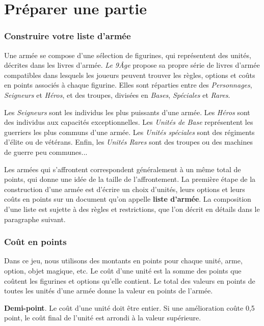 
\part{Préparer une partie}

\section{Construire votre liste d'armée}
\label{construire_liste}


Une armée se compose d'une sélection de figurines, qui représentent des unités, décrites dans les livres d'armée. \emph{Le 9\ieme Âge} propose sa propre série de livres d'armée compatibles dans lesquels les joueurs peuvent trouver les règles, options et coûts en points associés à chaque figurine. Elles sont réparties entre des \emph{Personnages}, \emph{Seigneurs} et \emph{Héros}, et des troupes, divisées en \emph{Bases}, \emph{Spéciales} et \emph{Rares}.

Les \emph{Seigneurs} sont les individus les plus puissants d'une armée. Les \emph{Héros} sont des individus aux capacités exceptionnelles. Les \emph{Unités de Base} représentent les guerriers les plus communs d'une armée. Les \emph{Unités spéciales} sont des régiments d'élite ou de vétérans. Enfin, les \emph{Unités Rares} sont des troupes ou des machines de guerre peu communes...

Les armées qui s'affrontent correspondent généralement à un même total de points, qui donne une idée de la taille de l'affrontement. La première étape de la construction d'une armée est d'écrire un choix d'unités, leurs options et leurs coûts en points sur un document qu'on appelle \textbf{liste d'armée}. La composition d'une liste est sujette à des règles et restrictions, que l'on décrit en détails dans le paragraphe suivant.

\section{Coût en points}

Dans ce jeu, nous utilisons des montants en points pour chaque unité, arme, option, objet magique, etc. Le coût d'une unité est la somme des points que coûtent les figurines et options qu'elle contient. Le total des valeurs en points de toutes les unités d'une armée donne la valeur en points de l'armée.

\textbf{Demi-point}. Le coût d'une unité doit être entier. Si une amélioration coûte 0,5 point, le coût final de l'unité est arrondi à la valeur supérieure.

